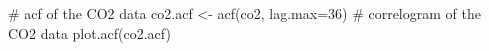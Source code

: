 \begin{Schunk}
\begin{Sinput}
 # acf of the CO2 data
 co2.acf <- acf(co2, lag.max=36)
 # correlogram of the CO2 data
 plot.acf(co2.acf)
\end{Sinput}
\end{Schunk}
